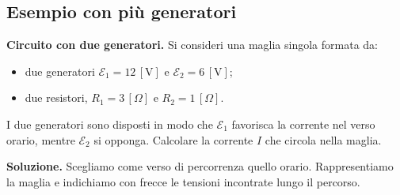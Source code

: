 \subsection{Esempio con più generatori}

\begin{esempio}
\textbf{Circuito con due generatori.} Si consideri una maglia singola formata da:
\begin{itemize}[leftmargin=1cm]
  \item due generatori \(\mathcal{E}_1 = 12\,[\text{V}]\) e \(\mathcal{E}_2 = 6\,[\text{V}]\);
  \item due resistori, \(R_1 = 3\,[\Omega]\) e \(R_2 = 1\,[\Omega]\).
\end{itemize}
I due generatori sono disposti in modo che \(\mathcal{E}_1\) favorisca la corrente nel verso orario, mentre \(\mathcal{E}_2\) si opponga. Calcolare la corrente \(I\) che circola nella maglia.

\smallskip
\textbf{Soluzione.} Scegliamo come verso di percorrenza quello orario. Rappresentiamo la maglia e indichiamo con frecce le tensioni incontrate lungo il percorso.



\begin{center}
\end{center}
\end{esempio}
